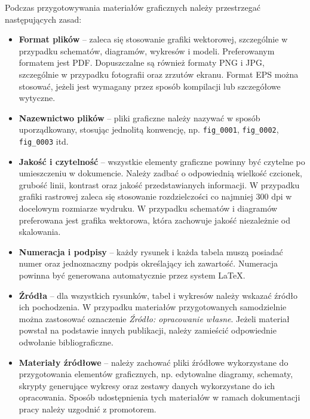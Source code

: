 Podczas przygotowywania materiałów graficznych należy przestrzegać następujących zasad:

\begin{itemize}

    \item \textbf{Format plików} -- zaleca się stosowanie grafiki wektorowej, szczególnie w przypadku schematów, diagramów, wykresów i modeli. Preferowanym formatem jest PDF. Dopuszczalne są również formaty PNG i JPG, szczególnie w przypadku fotografii oraz zrzutów ekranu. Format EPS można stosować, jeżeli jest wymagany przez sposób kompilacji lub szczegółowe wytyczne.

    \item \textbf{Nazewnictwo plików} -- pliki graficzne należy nazywać w sposób uporządkowany, stosując jednolitą konwencję, np. \texttt{fig\_0001}, \texttt{fig\_0002}, \texttt{fig\_0003} itd.

    \item \textbf{Jakość i czytelność} -- wszystkie elementy graficzne powinny być czytelne po umieszczeniu w dokumencie. Należy zadbać o odpowiednią wielkość czcionek, grubość linii, kontrast oraz jakość przedstawianych informacji. W przypadku grafiki rastrowej zaleca się stosowanie rozdzielczości co najmniej 300 dpi w docelowym rozmiarze wydruku. W przypadku schematów i diagramów preferowana jest grafika wektorowa, która zachowuje jakość niezależnie od skalowania.

    \item \textbf{Numeracja i podpisy} -- każdy rysunek i każda tabela muszą posiadać numer oraz jednoznaczny podpis określający ich zawartość. Numeracja powinna być generowana automatycznie przez system \LaTeX{}.

    \item \textbf{Źródła} -- dla wszystkich rysunków, tabel i wykresów należy wskazać źródło ich pochodzenia.
    W przypadku materiałów przygotowanych samodzielnie można zastosować oznaczenie \textit{Źródło: opracowanie własne}. Jeżeli materiał powstał na podstawie innych publikacji, należy zamieścić odpowiednie odwołanie bibliograficzne.

    \item \textbf{Materiały źródłowe} -- należy zachować pliki źródłowe wykorzystane do przygotowania elementów graficznych, np. edytowalne diagramy, schematy, skrypty generujące wykresy oraz zestawy danych wykorzystane do ich opracowania. Sposób udostępnienia tych materiałów w ramach dokumentacji pracy należy uzgodnić z promotorem.

\end{itemize}


